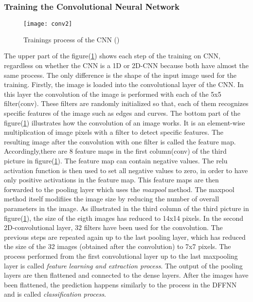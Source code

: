 \subsubsection{Training the Convolutional Neural Network}

\begin{figure}[htb]
	\centering
	\texttt{[image: conv2]}
	\caption[Convolutional Neural Network]{Trainings process of the CNN (\cite{[5]})} \label{Abb:cnn_process}
\end{figure}

The upper part of the figure(\ref{Abb:cnn_process}) shows each step of the training on CNN, regardless on whether the CNN is 
a 1D or 2D-CNN because both have almost the same process. 
The only difference is the shape of the input image used for the training. 
Firstly, the image is loaded into the convolutional layer of the CNN. 
In this layer the convolution of the image is performed with each of the 5x5 filter(conv). 
These filters are randomly initialized so that, each of them recognizes specific features of the image such as edges and curves. 
The bottom part of the figure(\ref{Abb:cnn_process}) illustrates how the convolution of an image works.
It is an element-wise multiplication of image pixels with a filter to detect specific features.
The resulting image after the convolution with one filter is called the feature map.
Accordingly,there are 8 feature maps in the first column(conv) of the third picture in figure(\ref{Abb:cnn_process}). 
The feature map can contain negative values. 
The relu activation function is then used to set all negative values to zero, in order to have only positive 
activations in the feature map.
This feature maps are then forwarded to the pooling layer which uses the \emph{maxpool} method. 
The maxpool method itself modifiies the image size by reducing the number of overall parameters in the image. 
As illustrated in the third column of the third picture in figure(\ref{Abb:cnn_process}), the size of the eigth images has reduced to 14x14 pixels. 
In the second 2D-convolutional layer, 32 filters have been used for the convolution. 
The previous steps are repeated again up to the last pooling layer, which has reduced the size of the 32 images (obtained 
after the convolution) to 7x7 pixels. 
The process performed from the first convolutional layer up to the last maxpooling layer is called \emph{feature learning and extraction process}. 
The output of the pooling layers are then flattened and connected to the dense layers. 
After the images have been flattened, the prediction happens similarly to the process in the DFFNN and is called \emph{classification process}. \hfill \break

